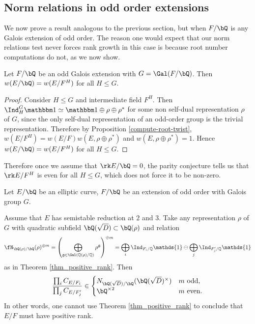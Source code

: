 \subsection{Norm relations in odd order extensions}

We now prove a result analogous to the previous section, but when $F / \bQ$ is any Galois extension of odd order. The reason one would expect that our norm relations test never forces rank growth in this case is because root number computations do not, as we now show.

\begin{lemma}
 Let $F / \bQ$ be an odd Galois extension with $G = \Gal(F / \bQ)$. Then $w(E / \bQ) = w(E / F^H)$ for all $H \leq G$. 
\end{lemma}

\begin{proof}
Consider $H \leq G$ and intermediate field $F^H$. Then 
$\Ind_H^G \trivial \simeq \trivial \oplus 
\rho \oplus \rho^*$ for some non self-dual representation $\rho$ of $G$, since the only self-dual representation of an odd-order group is the trivial representation. Therefore by Proposition \ref{compute-root-twist}, $w(E / F^H) = w(E / F)w(E, \rho \oplus \rho^*)$ and $w(E, \rho \oplus \rho^*) = 1$. Hence $w(E / \bQ) = w(E / F^H)$ for all $H \leq G$. 
\end{proof}

Therefore once we assume that $\rk E / \bQ = 0$, the parity conjecture tells us that $\rk E / F^H$ is even for all $H \leq G$, which does not force it to be non-zero. 


\begin{thm}\label{odd-exts}
 Let $E / \bQ$ be an elliptic curve, $F / \bQ$ be an extension of odd order with Galois group $G$. 
 
Assume that $E$ has semistable reduction at $2$ and $3$. 
Take any representation $\rho$ of $G$ with quadratic subfield $\bQ(\sqrt{D}) \subset \bQ(\rho)$ and relation
\begin{equation*}\label{odd-exp} \repnorm{\rho}^{\oplus m} =
 \left(\bigoplus_{\mathfrak{g}\in\Gal(\QQ(\rho)/\QQ)}\rho^{\mathfrak{g}}\right)^{\oplus m }=\bigoplus_i\Ind_{F_i/\QQ}\mathds{1}\ominus\bigoplus_j\Ind_{F'_j/\QQ}\mathds{1}
\end{equation*}
 as in Theorem \ref{thm_positive_rank}. Then
 \[ \frac{\prod_i C_{E/F_i}}{\prod_j C_{E/F_j'}}  \in 
    \begin{cases}
        N_{\bQ(\sqrt{D}) / \bQ}(\bQ(\sqrt{D})^{\times}) & m \ \text{odd}, \\
        \bQ^{\times 2} & m \ \text{even}.
    \end{cases} \] 
    In other words, one cannot use Theorem \ref{thm_positive_rank} to conclude that $E / F$ must have positive rank. 
\end{thm}

